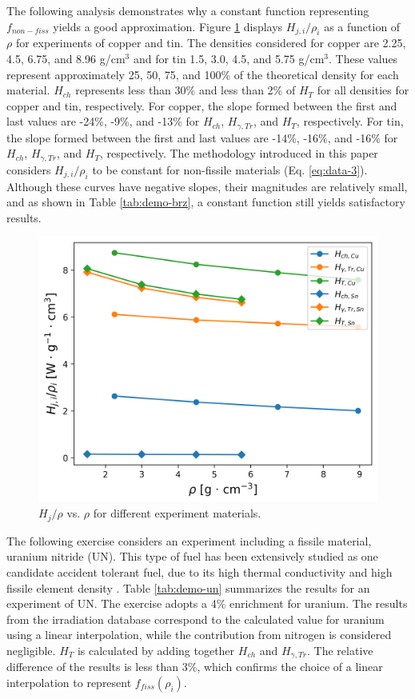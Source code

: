 The following analysis demonstrates why a constant function representing $f_{non-fiss}$ yields a good approximation.
Figure \ref{fig:H_rho1} displays $H_{j,i}/\rho_i$ as a function of $\rho$ for experiments of copper and tin.
The densities considered for copper are 2.25, 4.5, 6.75, and 8.96 g/cm$^3$ and for tin 1.5, 3.0, 4.5, and 5.75 g/cm$^3$.
These values represent approximately 25, 50, 75, and 100\% of the theoretical density for each material.
$H_{ch}$ represents less than 30\% and less than 2\% of $H_T$ for all densities for copper and tin, respectively.
For copper, the slope formed between the first and last values are -24\%, -9\%, and -13\% for $H_{ch}$, $H_{\gamma, Tr}$, and $H_{T}$, respectively.
For tin, the slope formed between the first and last values are -14\%, -16\%, and -16\% for $H_{ch}$, $H_{\gamma, Tr}$, and $H_{T}$, respectively.
The methodology introduced in this paper considers $H_{j,i}/\rho_i$ to be constant for non-fissile materials (Eq. \ref{eq:data-3}).
Although these curves have negative slopes, their magnitudes are relatively small, and as shown in Table \ref{tab:demo-brz}, a constant function still yields satisfactory results.

\begin{figure}[htbp!] %
    \centering
    \includegraphics[width=0.55\linewidth]{figures/toy-Cu_Sn_rho}
    \hfill
    \caption{$H_{j}/\rho$ vs. $\rho$ for different experiment materials.}
    \label{fig:H_rho1}
\end{figure}

The following exercise considers an experiment including a fissile material, uranium nitride (UN).
This type of fuel has been extensively studied as one candidate accident tolerant fuel, due to its high thermal conductivity and high fissile element density \cite{un}.
Table \ref{tab:demo-un} summarizes the results for an experiment of UN.
The exercise adopts a 4\% enrichment for uranium.
The results from the irradiation database correspond to the calculated value for uranium using a linear interpolation, while the contribution from nitrogen is considered negligible.
$H_T$ is calculated by adding together $H_{ch}$ and $H_{\gamma,Tr}$.
The relative difference of the results is less than 3\%, which confirms the choice of a linear interpolation to represent $f_{fiss}(\rho_i)$.

